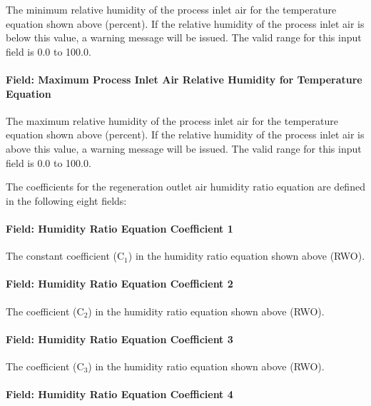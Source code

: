 The minimum relative humidity of the process inlet air for the temperature equation shown above (percent). If the relative humidity of the process inlet air is below this value, a warning message will be issued. The valid range for this input field is 0.0 to 100.0.

\paragraph{Field: Maximum Process Inlet Air Relative Humidity for Temperature Equation}\label{field-maximum-process-inlet-air-relative-humidity-for-temperature-equation}

The maximum relative humidity of the process inlet air for the temperature equation shown above (percent). If the relative humidity of the process inlet air is above this value, a warning message will be issued. The valid range for this input field is 0.0 to 100.0.

The coefficients for the regeneration outlet air humidity ratio equation are defined in the following eight fields:

\paragraph{Field: Humidity Ratio Equation Coefficient 1}\label{field-humidity-ratio-equation-coefficient-1}

The constant coefficient (C\(_{1}\)) in the humidity ratio equation shown above (RWO).

\paragraph{Field: Humidity Ratio Equation Coefficient 2}\label{field-humidity-ratio-equation-coefficient-2}

The coefficient (C\(_{2}\)) in the humidity ratio equation shown above (RWO).

\paragraph{Field: Humidity Ratio Equation Coefficient 3}\label{field-humidity-ratio-equation-coefficient-3}

The coefficient (C\(_{3}\)) in the humidity ratio equation shown above (RWO).

\paragraph{Field: Humidity Ratio Equation Coefficient 4}\label{field-humidity-ratio-equation-coefficient-4}

